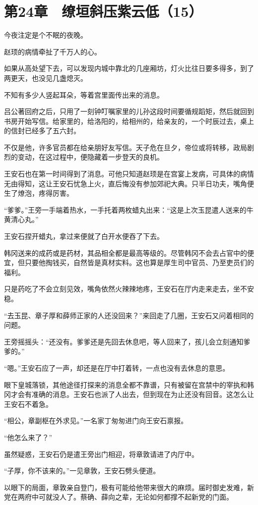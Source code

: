 \section{第24章　缭垣斜压紫云低（15）}

今夜注定是个不眠的夜晚。

赵顼的病情牵扯了千万人的心。

如果从高处望下去，可以发现内城中靠北的几座厢坊，灯火比往日要多得多，到了两更天，也没见几盏熄灭。

不知有多少人竖起耳朵，等着宫里面传出来的消息。

吕公著回府之后，只用了一刻钟叮嘱家里的儿孙这段时间要循规蹈矩，然后就回到书房开始写信。给家里的，给洛阳的，给相州的，给亲友的，一个时辰过去，桌上的信封已经多了五六封。

不仅是他，许多官员都在给亲朋好友写信。天子危在旦夕，帝位或将转移，政局剧烈的变动，在这过程中，便隐藏着一步登天的良机。

王安石也在第一时间得到了消息。可他只知道赵顼是在宫宴上发病，可具体的病情无由得知，这让王安石忧急上火，直后悔没有参加郊祀大典。只半日功夫，嘴角便生了燎泡，疼得厉害。

“爹爹。”王旁一手端着热水，一手托着两枚蜡丸出来：“这是上次玉昆遣人送来的牛黄清心丸。”

王安石捏开蜡丸，拿过来便就了白开水便吞了下去。

韩冈送来的成药或是药材，其品相全都是最高等级的。尽管韩冈不会去占官中的便宜，但只要他掏钱买，自然皆是真材实料。这也算是厚生司中官员、乃至吏员们的福利。

只是药吃了不会立刻见效，嘴角依然火辣辣地疼，王安石在厅内走来走去，坐不安稳。

“去玉昆、章子厚和薛师正家的人还没回来？”来回走了几圈，王安石又问着相同的问题。

王旁摇摇头：“还没有。爹爹还是先回去休息吧，等人回来了，孩儿会立刻通知爹爹的。”

“嗯。”王安石应了一声，却还是在厅中打着转，一点也没有去休息的意思。

眼下皇城落锁，其他途径打探来的消息全都不靠谱，只有被留在宫禁中的宰执和韩冈才会有准确的消息。王安石也派了人出去，但到现在为止还没有回音。这怎么让王安石不着急。

“相公，章副枢在外求见。”一名家丁匆匆进门向王安石禀报。

“他怎么来了？”

虽然疑惑，王安石仍是遣王旁出门相迎，将章敦请进了内厅中。

“子厚，你不该来的。”一见章敦，王安石劈头便道。

以眼下的局面，章敦亲自登门，极有可能给他带来很大的麻烦。届时御史发难，新党在两府中可就没人了。蔡确、薛向之辈，无论如何都撑不起新党的门面。

